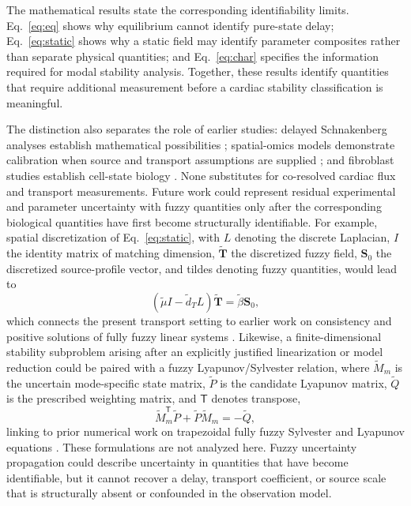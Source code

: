 \documentclass[preprint,11pt]{elsarticle}
\begin{document}
The mathematical results state the corresponding identifiability limits. Eq.~\eqref{eq:eq} shows why equilibrium cannot identify pure-state delay; Eq.~\eqref{eq:static} shows why a static field may identify parameter composites rather than separate physical quantities; and Eq.~\eqref{eq:char} specifies the information required for modal stability analysis. Together, these results identify quantities that require additional measurement before a cardiac stability classification is meaningful.

The distinction also separates the role of earlier studies: delayed Schnakenberg analyses establish mathematical possibilities \cite{Alfifi2022,Jiang2019,Sargood2022,Das2026}; spatial-omics models demonstrate calibration when source and transport assumptions are supplied \cite{Daher2026}; and fibroblast studies establish cell-state biology \cite{RuizVillalba2020,Schafer2017,Gao2021}. None substitutes for co-resolved cardiac flux and transport measurements. Future work could represent residual experimental and parameter uncertainty with fuzzy quantities only after the corresponding biological quantities have first become structurally identifiable. For example, spatial discretization of Eq.~\eqref{eq:static}, with $L$ denoting the discrete Laplacian, $I$ the identity matrix of matching dimension, $\tilde{\mathbf T}$ the discretized fuzzy field, $\mathbf S_0$ the discretized source-profile vector, and tildes denoting fuzzy quantities, would lead to
\begin{equation}
(\tilde{\mu}I-\tilde d_T L)\tilde{\mathbf T}
=
\tilde{\beta}\mathbf S_0 ,
\label{eq:fuzzy-static}
\end{equation}
which connects the present transport setting to earlier work on consistency and positive solutions of fully fuzzy linear systems \cite{MalkawiAlfifi2017}. Likewise, a finite-dimensional stability subproblem arising after an explicitly justified linearization or model reduction could be paired with a fuzzy Lyapunov/Sylvester relation, where $\tilde M_m$ is the uncertain mode-specific state matrix, $\tilde P$ is the candidate Lyapunov matrix, $\tilde Q$ is the prescribed weighting matrix, and ${\mathsf T}$ denotes transpose,
\begin{equation}
\tilde M_m^{\mathsf T}\tilde P+\tilde P\tilde M_m=-\tilde Q ,
\label{eq:fuzzy-lyap}
\end{equation}
linking to prior numerical work on trapezoidal fully fuzzy Sylvester and Lyapunov equations \cite{Elsayed2022FuzzySylvester}. These formulations are not analyzed here. Fuzzy uncertainty propagation could describe uncertainty in quantities that have become identifiable, but it cannot recover a delay, transport coefficient, or source scale that is structurally absent or confounded in the observation model.
\end{document}
